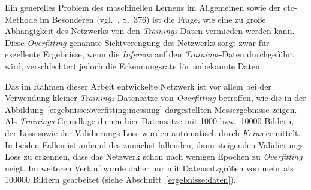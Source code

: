 Ein generelles Problem des maschinellen Lernens im Allgemeinen sowie der \gls{ctc}-Methode im Besonderen
(vgl.~\cite{graves2006}, S.\ 376) ist die Frage, wie eine zu große Abhängigkeit des Netzwerks von den
\textit{Trainings}-Daten vermieden werden kann. Diese \textit{Overfitting} genannte Sichtverengung des Netzwerks sorgt
zwar für exzellente Ergebnisse, wenn die \textit{Inferenz} auf den \textit{Trainings}-Daten durchgeführt wird,
verschlechtert jedoch die Erkennungsrate für unbekannte Daten.

Das im Rahmen dieser Arbeit entwickelte Netzwerk ist vor allem bei der Verwendung kleiner \textit{Trainings}-Datensätze
von \textit{Overfitting} betroffen, wie die in der Abbildung~\ref{ergebnisse:overfitting:messung} dargestellten
Messergebnisse zeigen. Als \textit{Trainings}-Grundlage dienen hier Datensätze mit \num{1000} bzw.\ \num{10000} Bildern,
der Loss sowie der Validierungs-Loss wurden automatisch durch \textit{Keras} ermittelt. In beiden Fällen ist anhand des
zunächst fallenden, dann steigenden Validierungs-Loss zu erkennen, dass das Netzwerk schon nach wenigen Epochen zu
\textit{Overfitting} neigt. Im weiteren Verlauf wurde daher nur mit Datensatzgrößen von mehr als \num{100000} Bildern
gearbeitet (siehe Abschnitt~\ref{ergebnisse:daten}).

